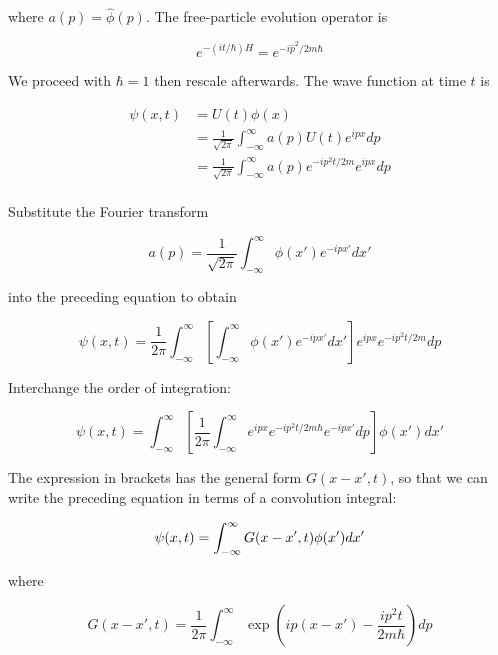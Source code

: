 where $a(p) = \hat\phi(p)$.
The free-particle evolution operator is

\begin{equation}
e^{-(it/\hbar)H} = e^{-i\hat p^2/2m\hbar}
\end{equation}

We proceed with $\hbar = 1$ then rescale afterwards.  
The wave function at time $t$ is 

\begin{align}
\psi(x,t) &= U(t)\phi(x) \\
&= \frac{1}{\sqrt{2\pi}}\int_{-\infty}^\infty a(p) U(t)e^{ipx} dp\\
&= \frac{1}{\sqrt{2\pi}}\int_{-\infty}^\infty a(p) e^{-i p^2t/2m} e^{ipx} dp \\
\end{align}

Substitute the Fourier transform

\begin{equation}
a(p) = \frac{1}{\sqrt{2\pi}}\int_{-\infty}^\infty \phi(x') e^{-ipx'} dx'
\end{equation}

into the preceding equation to obtain

\begin{equation}
\psi(x,t) = \frac{1}{2\pi} \int_{-\infty}^\infty  \left[  \int_{-\infty}^\infty \phi(x') e^{-ipx'} dx'\right] e^{ipx}  e^{ -ip^2t/2m } dp
\end{equation}

Interchange the order of integration:

\begin{equation}
\psi(x,t) = \int_{-\infty}^\infty  \left[ \frac{1}{2\pi}  \int_{-\infty}^\infty e^{ipx} e^{ -ip^2t/2m \hbar} e^{-ipx'} dp \right] \phi(x')  dx'
\end{equation}

The expression in brackets has the general form $G(x-x',t)$, so that we can write the preceding equation in terms of a convolution integral:

\begin{equation}
\psi(x,t) = \int_{-\infty}^\infty G(x-x', t)\phi(x') dx'\\
\end{equation}

where

\begin{equation}
\label{gffp}
G(x-x',t) = \frac{1}{2\pi}  \int_{-\infty}^\infty   \exp\left(ip(x-x')  -\frac{ip^2t}{2m \hbar} \right) dp
\end{equation}

